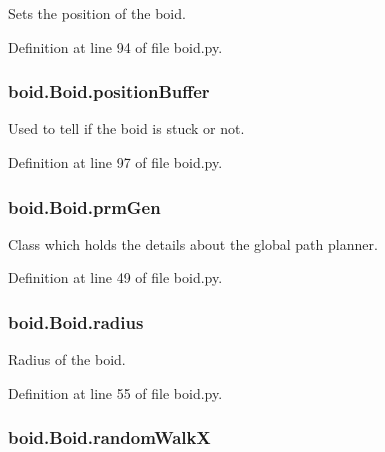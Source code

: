 Sets the position of the boid. 



Definition at line 94 of file boid.\-py.

\hypertarget{classboid_1_1Boid_ab6c778a50dd384fabc6aa48be04c0988}{
\subsubsection[{position\-Buffer}]{\setlength{\rightskip}{0pt plus 5cm}boid.\-Boid.\-position\-Buffer}}\label{classboid_1_1Boid_ab6c778a50dd384fabc6aa48be04c0988}


Used to tell if the boid is stuck or not. 



Definition at line 97 of file boid.\-py.

\hypertarget{classboid_1_1Boid_ac7d14690dde12ebc05f8f5ea80e29869}{
\subsubsection[{prm\-Gen}]{\setlength{\rightskip}{0pt plus 5cm}boid.\-Boid.\-prm\-Gen}}\label{classboid_1_1Boid_ac7d14690dde12ebc05f8f5ea80e29869}


Class which holds the details about the global path planner. 



Definition at line 49 of file boid.\-py.

\hypertarget{classboid_1_1Boid_a1bff2843c74b712aba274831d0a715d4}{
\subsubsection[{radius}]{\setlength{\rightskip}{0pt plus 5cm}boid.\-Boid.\-radius}}\label{classboid_1_1Boid_a1bff2843c74b712aba274831d0a715d4}


Radius of the boid. 



Definition at line 55 of file boid.\-py.

\hypertarget{classboid_1_1Boid_a996d92e215eb56d98a811c86c7118637}{
\subsubsection[{random\-Walk\-X}]{\setlength{\rightskip}{0pt plus 5cm}boid.\-Boid.\-random\-Walk\-X}}\label{classboid_1_1Boid_a996d92e215eb56d98a811c86c7118637}


